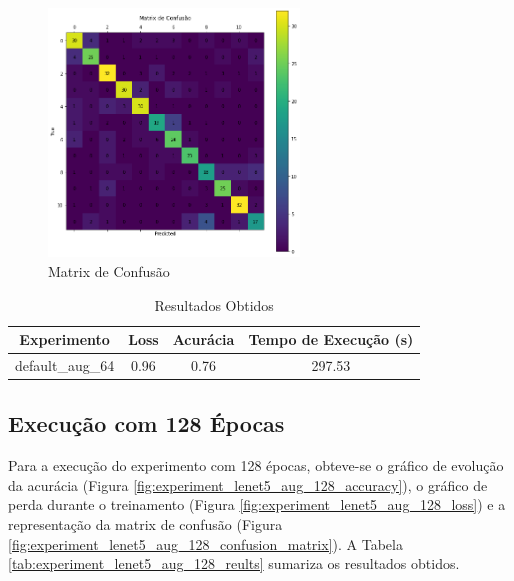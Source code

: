 \documentclass[12pt]{article}
\begin{document}
\begin{figure}[!htb]
  \centering
  \includegraphics[width=18em]{experiments/default_aug_64/confusion_matrix.png}
  \caption{Matrix de Confusão}
  \label{fig:experiment_default_aug_64_confusion_matrix}
\end{figure}

\begin{table}[!htb]
  \centering
  \begin{tabular}{|c|c|c|c|}
    \hline
    \textbf{Experimento} & \textbf{Loss} & \textbf{Acurácia} & \textbf{Tempo de Execução (s)} \\ \hline
    default\_aug\_64     & 0.96          & 0.76              & 297.53                         \\ \hline
  \end{tabular}
  \caption{Resultados Obtidos}
  \label{tab:experiment_default_aug_64_reults}
\end{table}

\newpage

\subsection{Execução com 128 Épocas}

Para a execução do experimento com 128 épocas, obteve-se o gráfico de evolução da acurácia (Figura \ref{fig:experiment_lenet5_aug_128_accuracy}), o gráfico de perda durante o treinamento (Figura \ref{fig:experiment_lenet5_aug_128_loss}) e a representação da matrix de confusão (Figura \ref{fig:experiment_lenet5_aug_128_confusion_matrix}). A Tabela \ref{tab:experiment_lenet5_aug_128_reults} sumariza os resultados obtidos.
\end{document}
